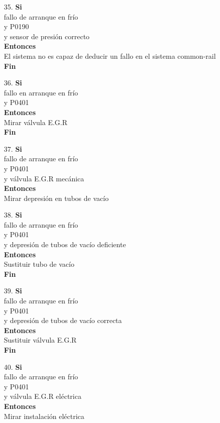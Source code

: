 \documentclass[a4paper,12pt]{article}
\newcommand\tab[1][1cm]{\hspace*{#1}}
\begin{document}
\begin{itemize}
\item[35.]\textbf{Si}\\ \tab fallo de arranque en frío\\ \tab y P0190\\ \tab y sensor de presión correcto \\ \textbf{Entonces}\\ \tab El sistema no es capaz de deducir un fallo en el sistema common-rail \\ \tab \textbf{Fin}
\item[36.]\textbf{Si}\\ \tab fallo en arranque en frío\\ \tab y P0401\\ \textbf{Entonces}\\ \tab Mirar válvula E.G.R\\ \tab \textbf{Fin}
\item[37.]\textbf{Si}\\ \tab fallo de arranque en frío\\ \tab y P0401\\ \tab y válvula E.G.R mecánica\\  \textbf{Entonces}\\ \tab Mirar depresión en tubos de vacío
\item[38.]\textbf{Si}\\ \tab fallo de arranque en frío\\ \tab y P0401\\ \tab y depresión de tubos de vacío deficiente\\ \textbf{Entonces}\\ \tab Sustituir tubo de vacío\\ \tab \textbf{Fin}
\item[39.]\textbf{Si}\\ \tab fallo de arranque en frío\\ \tab y P0401\\ \tab y depresión de tubos de vacío correcta\\ \textbf{Entonces}\\ \tab Sustituir válvula E.G.R\\ \tab \textbf{Fin}
\item[40.]\textbf{Si}\\ \tab fallo de arranque en frío\\ \tab y P0401\\ \tab y válvula E.G.R eléctrica\\  \textbf{Entonces}\\ \tab Mirar instalación eléctrica

\end{itemize}
\end{document}

